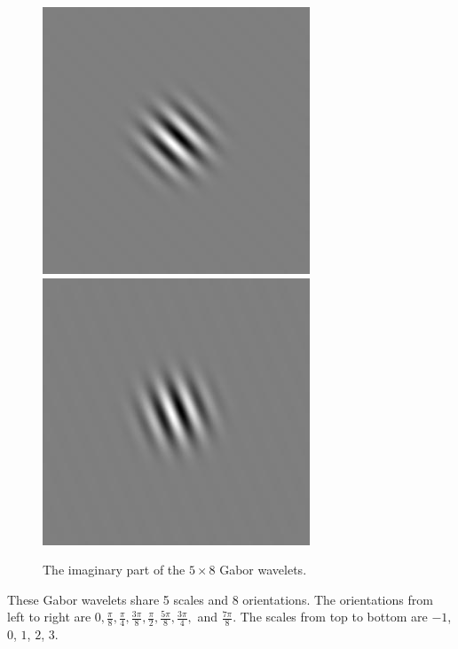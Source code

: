 \begin{figure}[ht]
\begin{center}
 \includegraphics[width=\columnwidth/9]{ch4/figures/iGabor4_6.jpg}
 \includegraphics[width=\columnwidth/9]{ch4/figures/iGabor4_7.jpg}\\
\caption{The imaginary part of the $5\times8$ Gabor wavelets.}
\label{fig:imaggabor}
\end{center}
\end{figure} 
These Gabor wavelets share 5 scales and 8 orientations. The orientations from left to right are $0,\frac{\pi}{8},\frac{\pi}{4},\frac{3\pi}{8},\frac{\pi}{2},\frac{5\pi}{8},\frac{3\pi}{4},$ and $\frac{7\pi}{8}$. The scales from top to bottom are $-1$, $0$, $1$, $2$, $3$.

